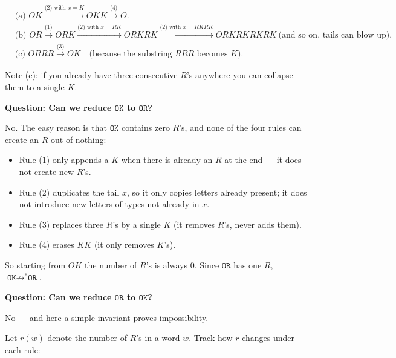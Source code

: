\documentclass[12pt]{article}
\begin{document}
\[
\begin{aligned}
&\text{(a) }OK \xrightarrow{\text{(2) with }x=K} OKK \xrightarrow{\text{(4)}} O.\\[4pt]
&\text{(b) }OR \xrightarrow{\text{(1)}} ORK \xrightarrow{\text{(2) with }x=RK} ORKRK
          \xrightarrow{\text{(2) with }x=RKRK} ORKRKRKRK \ \text{(and so on, tails can blow up).}\\[4pt]
&\text{(c) }ORRR \xrightarrow{\text{(3)}} OK \quad\text{(because the substring \(RRR\) becomes \(K\)).}
\end{aligned}
\]

Note (c): if you already have three consecutive \(R\)'s anywhere you can collapse them to a single \(K\).

\bigskip

\textbf{Question: Can we reduce \(\texttt{OK}\) to \(\texttt{OR}\)?}  

No. The easy reason is that \(\texttt{OK}\) contains zero \(R\)'s, and none of the four rules can create an \(R\) out of nothing:

\begin{itemize}
  \item Rule (1) only appends a \(K\) when there is already an \(R\) at the end — it does not create new \(R\)'s.
  \item Rule (2) duplicates the tail \(x\), so it only copies letters already present; it does not introduce new letters of types not already in \(x\).
  \item Rule (3) replaces three \(R\)'s by a single \(K\) (it removes \(R\)'s, never adds them).
  \item Rule (4) erases \(KK\) (it only removes \(K\)'s).
\end{itemize}

So starting from \(OK\) the number of \(R\)'s is always \(0\). Since \(\texttt{OR}\) has one \(R\), \(\texttt{OK}\not\to^{*}\texttt{OR}\).

\bigskip

\textbf{Question: Can we reduce \(\texttt{OR}\) to \(\texttt{OK}\)?}  

No — and here a simple invariant proves impossibility.

Let \(r(w)\) denote the number of \(R\)'s in a word \(w\). Track how \(r\) changes under each rule:
\end{document}
